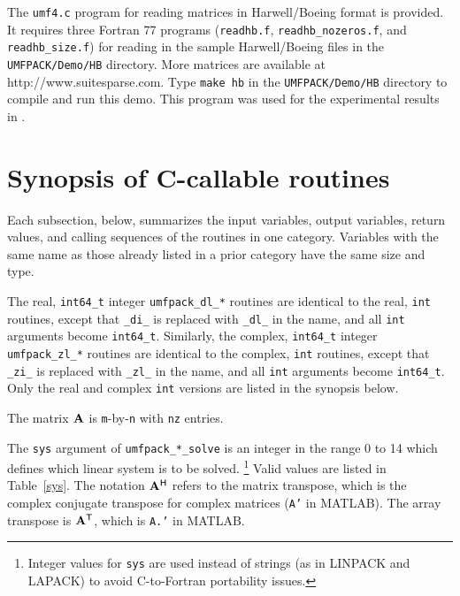 \documentclass[11pt]{article}
\newcommand{\m}[1]{{\bf{#1}}}       %
\newcommand{\tr}{^{\sf T}}          %
\newcommand{\he}{^{\sf H}}          %
\begin{document}
The {\tt umf4.c} program for reading matrices in Harwell/Boeing format
\cite{DuffGrimesLewis87b} is provided.  It requires three Fortran 77 programs
({\tt readhb.f}, {\tt readhb\_nozeros.f}, and {\tt readhb\_size.f})
for reading in the sample Harwell/Boeing files in the {\tt UMFPACK/Demo/HB}
directory.  More matrices are available at
http://www.suitesparse.com.
Type {\tt make hb} in the {\tt UMFPACK/Demo/HB} directory
to compile and run this demo.  This program was used for the experimental
results in \cite{Davis03}.

\section{Synopsis of C-callable routines}
\label{Synopsis}

Each subsection, below, summarizes the input variables, output variables, return
values, and calling sequences of the routines in one category.  Variables with
the same name as those already listed in a prior category have the same size
and type.

The real, \verb'int64_t' integer {\tt umfpack\_dl\_*} routines are
identical to the real, {\tt int} routines, except that {\tt \_di\_} is replaced
with {\tt \_dl\_} in the name, and all {\tt int} arguments become
\verb'int64_t'.
Similarly, the complex, \verb'int64_t' integer {\tt umfpack\_zl\_*} routines are
identical to the complex, {\tt int} routines, except that {\tt \_zi\_} is
replaced
with {\tt \_zl\_} in the name, and all {\tt int} arguments become
\verb'int64_t'.
Only the real and complex {\tt int} versions are listed in the synopsis below.

The matrix $\m{A}$ is {\tt m}-by-{\tt n} with {\tt nz} entries.

The {\tt sys} argument of {\tt umfpack\_*\_solve}
is an integer in the range 0 to 14 which defines which linear system is
to be solved.
\footnote{Integer values for {\tt sys} are used instead of strings (as in LINPACK
and LAPACK) to avoid C-to-Fortran portability issues.}
Valid values are listed in Table~\ref{sys}.
The notation $\m{A}\he$ refers to the matrix transpose, which is the
complex conjugate transpose for complex matrices ({\tt A'} in MATLAB).
The array transpose is $\m{A}\tr$, which is {\tt A.'} in MATLAB.
\end{document}
